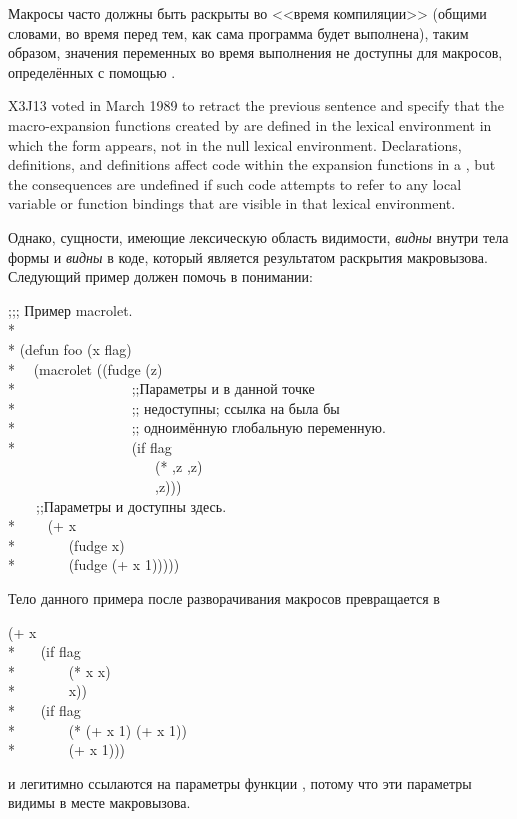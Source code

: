 \begin{defmac}
Макросы часто должны быть раскрыты во <<время компиляции>> (общими словами,
во время перед тем, как сама программа будет выполнена), таким образом, значения
переменных во время выполнения не доступны для макросов, определённых с помощью
.

\begin{newer}
X3J13 voted in March 1989 
to retract the previous sentence and specify that the macro-expansion
functions created by  are defined in the lexical environment in which
the  form appears, not in the null lexical environment.
Declarations,  definitions, and  definitions
affect code within the expansion functions in a , but the
consequences are undefined if such code attempts to refer to
any local variable or function bindings that are visible in that
lexical environment.
\end{newer}

Однако, сущности, имеющие лексическую область видимости, \emph{видны} внутри
тела формы  и \emph{видны} в коде, который является результатом
раскрытия макровызова. Следующий пример должен помочь в понимании:
\begin{lisp}
;;; Пример macrolet. \\*
\\*
(defun foo (x flag) \\*
~~(macrolet ((fudge (z) \\*
~~~~~~~~~~~~~~~~;;\textrm{Параметры  и  в данной точке} \\*
~~~~~~~~~~~~~~~~;; \textrm{недоступны; ссылка на  была бы} \\*
~~~~~~~~~~~~~~~~;; \textrm{одноимённую глобальную переменную.} \\*
~~~~~~~~~~~~~~~~{\Xbq}(if flag \\
~~~~~~~~~~~~~~~~~~~~~(* ,z ,z) \\
~~~~~~~~~~~~~~~~~~~~~,z))) \\
~~~~;;\textrm{Параметры  и  доступны здесь.} \\*
~~~~(+ x \\*
~~~~~~~(fudge x) \\*
~~~~~~~(fudge (+ x 1)))))
\end{lisp}
Тело данного примера после разворачивания макросов превращается в
\begin{lisp}
(+ x \\*
~~~(if flag \\*
~~~~~~~(* x x) \\*
~~~~~~~x)) \\*
~~~(if flag \\*
~~~~~~~(* (+ x 1) (+ x 1)) \\*
~~~~~~~(+ x 1)))
\end{lisp}
 и  легитимно ссылаются на параметры функции
, потому что эти параметры видимы в месте макровызова.


\end{defmac}
